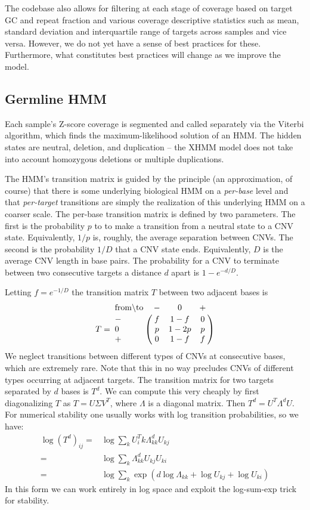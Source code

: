 \documentclass[nofootinbib,amssymb,amsmath]{revtex4}
\begin{document}
The codebase also allows for filtering at each stage of coverage based on target GC and repeat fraction and various coverage descriptive statistics such as mean, standard deviation and interquartile range of targets across samples and vice versa.  However, we do not yet have a sense of best practices for these.  Furthermore, what constitutes best practices will change as we improve the model.

\subsection{Germline HMM} \label{germline-hmm}
Each sample's Z-score coverage is segmented and called separately via the Viterbi algorithm, which finds the maximum-likelihood solution of an HMM.  The hidden states are neutral, deletion, and duplication -- the XHMM model does not take into account homozygous deletions or multiple duplications.  

The HMM's transition matrix is guided by the principle (an approximation, of course) that there is some underlying biological HMM on a \textit{per-base} level and that \textit{per-target} transitions are simply the realization of this underlying HMM on a coarser scale.  The per-base transition matrix is defined by two parameters.  The first is the probability $p$ to to make a transition from a neutral state to a CNV state.  Equivalently, $1/p$ is, roughly, the average separation between CNVs.  The second is the probability $1/D$ that a CNV state ends.  Equivalently, $D$ is the average CNV length in base pairs.   The probability for a CNV to terminate between two consecutive targets a distance $d$ apart is $1 - e^{-d/D}$.
  
Letting $f = e^{-1/D}$ the transition matrix $T$ between two adjacent bases is
%
\begin{equation}
T = \bordermatrix{ {\rm from} \backslash {\rm to} & - & 0 & + \cr
      - & f & 1-f & 0 \cr
      0 & p & 1-2p & p \cr
      + & 0 & 1-f & f}
\end{equation}
%
We neglect transitions between different types of CNVs at consecutive bases, which are extremely rare.  Note that this in no way precludes CNVs of different types occurring at adjacent targets.  The transition matrix for two targets separated by $d$ bases is $T^d$.  We can compute this very cheaply by first diagonalizing $T$ as $T = U \Sigma V^T$, where $\Lambda$ is a diagonal matrix.  Then $T^d = U^T \Lambda^d U$.  For numerical stability one usually works with log transition probabilities, so we have:
%
\begin{align}
\log \left(T^d \right)_{ij} =& \log \sum_k U^T_ik \Lambda^d_{kk} U_{kj} \\
				    =& \log \sum_k \Lambda^d_{kk} U_{kj} U_{ki} \\ 
				    =& \log \sum_k \exp \left( d \log \Lambda_{kk} + \log U_{kj} + \log U_{ki}  \right)
\end{align}
%
In this form we can work entirely in log space and exploit the log-sum-exp trick for stability.
\end{document}
